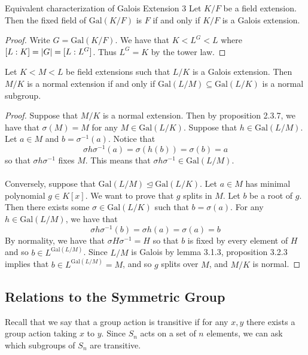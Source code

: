 \documentclass[a4paper]{article}
\begin{document}
\begin{prp}{Equivalent characterization of Galois Extension 3}{} Let $K/F$ be a field extension. Then the fixed field of $\text{Gal}(K/F)$ is $F$ if and only if $K/F$ is a Galois extension. \tcbline
\begin{proof}
Write $G=\text{Gal}(K/F)$. We have that $K<L^G<L$ where $[L:K]=\abs{G}=[L:L^G]$. Thus $L^G=K$ by the tower law. 
\end{proof}
\end{prp}

\begin{prp}{}{} Let $K<M<L$ be field extensions such that $L/K$ is a Galois extension. Then $M/K$ is a normal extension if and only if $\text{Gal}(L/M)\subseteq\text{Gal}(L/K)$ is a normal subgroup. \tcbline
\begin{proof}
Suppose that $M/K$ is a normal extension. Then by proposition 2.3.7, we have that $\sigma(M)=M$ for any $M\in\text{Gal}(L/K)$. Suppose that $h\in\text{Gal}(L/M)$. Let $a\in M$ and $b=\sigma^{-1}(a)$. Notice that $$\sigma h\sigma^{-1}(a)=\sigma(h(b))=\sigma(b)=a$$ so that $\sigma h\sigma^{-1}$ fixes $M$. This means that $\sigma h\sigma^{-1}\in\text{Gal}(L/M)$. \\~\\

Conversely, suppose that $\text{Gal}(L/M)\trianglelefteq\text{Gal}(L/K)$. Let $a\in M$ has minimal polynomial $g\in K[x]$. We want to prove that $g$ splits in $M$. Let $b$ be a root of $g$. Then there exists some $\sigma\in\text{Gal}(L/K)$ such that $b=\sigma(a)$. For any $h\in\text{Gal}(L/M)$, we have that $$\sigma h\sigma^{-1}(b)=\sigma h(a)=\sigma(a)=b$$ By normality, we have that $\sigma H\sigma^{-1}=H$ so that $b$ is fixed by every element of $H$ and so $b\in L^{\text{Gal}(L/M)}$. Since $L/M$ is Galois by lemma 3.1.3, proposition 3.2.3 implies that $b\in L^{\text{Gal}(L/M)}=M$, and so $g$ splits over $M$, and $M/K$ is normal. 
\end{proof}
\end{prp}

\subsection{Relations to the Symmetric Group}
Recall that we say that a group action is transitive if for any $x,y$ there exists a group action taking $x$ to $y$. Since $S_n$ acts on a set of $n$ elements, we can ask which subgroups of $S_n$ are transitive. 
\end{document}
